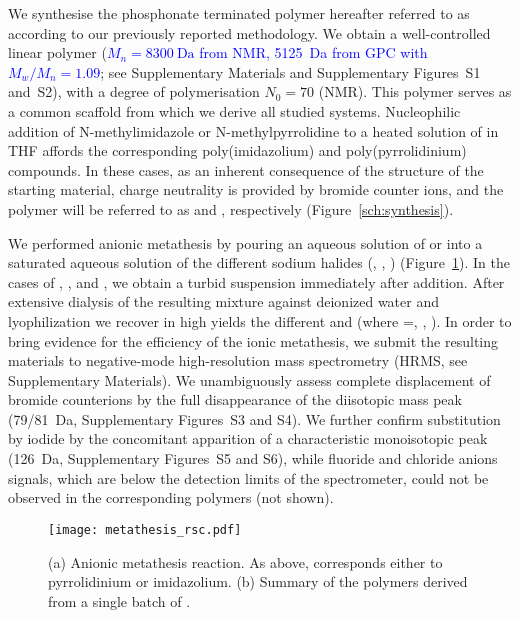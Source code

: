 \documentclass[twoside,twocolumn,9pt]{article}
\newcommand{\figSsec}{S1\xspace}
\newcommand{\figSNMR}{S2\xspace}
\newcommand{\figSmassPImBr}{S3\xspace}
\newcommand{\figSmassPPyBr}{S4\xspace}
\newcommand{\figSmassPImI}{S5\xspace}
\newcommand{\figSmassPPyI}{S6\xspace}
\begin{document}
We synthesise the phosphonate terminated polymer hereafter referred to as  according to our previously reported methodology\cite{Srour2014,Appukuttan2012}. We obtain a well-controlled linear polymer (\textcolor{blue}{$M_n= \SI{8300}{\dalton}$ from NMR, \SI{5125}{\dalton} from GPC with $M_w/M_n = 1.09$}; see Supplementary Materials and Supplementary Figures~\figSsec and~\figSNMR), with a degree of polymerisation $N_0=70$ (NMR). This polymer serves as a common scaffold from which we derive  all studied systems. Nucleophilic addition of N-methylimidazole or N-methylpyrrolidine to a heated solution of  in THF affords the corresponding poly(imidazolium) and poly(pyrrolidinium) compounds. In these cases, as an inherent consequence of the structure of the starting material, charge neutrality is provided by bromide counter ions, and the polymer will be referred to as  and , respectively (Figure~\ref{sch:synthesis}).



We performed anionic metathesis by pouring an aqueous solution of  or  into a saturated aqueous solution of the different sodium halides (, , ) (Figure~\ref{sch:metathesis}). In the cases of ,  ,  and , we obtain a turbid suspension immediately after addition. After extensive dialysis of the resulting mixture against deionized water and lyophilization we recover in high yields the different  and  (where =, , ). In order to bring evidence for the efficiency of the ionic metathesis, we submit the resulting materials to negative-mode high-resolution mass spectrometry (HRMS, see Supplementary Materials). We unambiguously assess complete displacement of bromide counterions by the full disappearance of the diisotopic mass peak (79/\SI{81}{\dalton}, Supplementary Figures~\figSmassPImBr and \figSmassPPyBr). We further confirm substitution by iodide by the concomitant apparition of a characteristic monoisotopic peak (\SI{126}{\dalton}, Supplementary Figures~\figSmassPImI and \figSmassPPyI), while fluoride and chloride anions signals, which are below the detection limits of the spectrometer, could not be observed in the corresponding polymers (not shown).

\begin{figure}
\texttt{[image: metathesis\_rsc.pdf]}
\caption{(a) Anionic metathesis reaction. As above,  corresponds either to pyrrolidinium or imidazolium. (b) Summary of the polymers derived from a single batch of .}
\label{sch:metathesis}
\end{figure}
\end{document}
